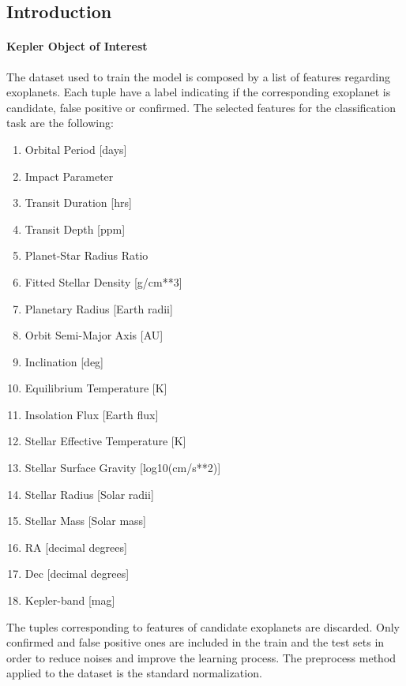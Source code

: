 \documentclass[11pt, a4paper]{article}
\begin{document}
\begin{multicols}{2}
\section{Introduction}
  \paragraph{Kepler Object of Interest}
    The dataset used to train the model is composed by a list of features regarding exoplanets. Each tuple have a label indicating if the corresponding exoplanet is candidate, false positive or confirmed. The selected features for the classification task are the following:
    \begin{enumerate}
      \item Orbital Period [days]
      \item Impact Parameter
      \item Transit Duration [hrs]
      \item Transit Depth [ppm]
      \item Planet-Star Radius Ratio
      \item Fitted Stellar Density [g/cm**3]
      \item Planetary Radius [Earth radii]
      \item Orbit Semi-Major Axis [AU]
      \item Inclination [deg]
      \item Equilibrium Temperature [K]
      \item Insolation Flux [Earth flux]
      \item Stellar Effective Temperature [K]
      \item Stellar Surface Gravity [log10(cm/s**2)]
      \item Stellar Radius [Solar radii]
      \item Stellar Mass [Solar mass]
      \item RA [decimal degrees]
      \item Dec [decimal degrees]
      \item Kepler-band [mag]
    \end{enumerate}
    The tuples corresponding to features of candidate exoplanets are discarded. Only confirmed and false positive ones are included in the train and the test sets in order to reduce noises and improve the learning process. The preprocess method applied to the dataset is the standard normalization.

\end{multicols}
\end{document}
